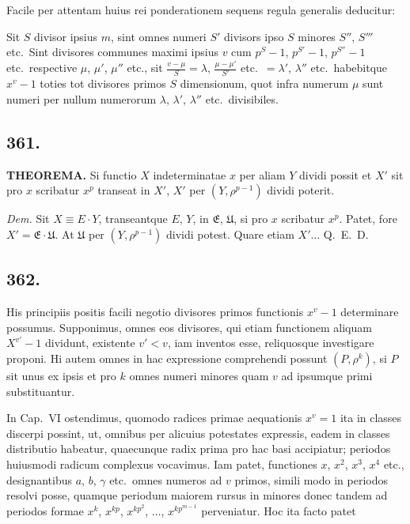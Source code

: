 \documentclass[12pt]{article}
\begin{document}
Facile per attentam huius rei ponderationem sequens regula generalis deducitur:

Sit $S$ divisor ipsius $m$, sint omnes numeri $S'$ divisors ipso $S$ minores $S''$, $S'''$ etc.~Sint divisores communes maximi ipsius $v$ cum $p^S-1$, $p^{S'}-1$, $p^{S''}-1$ etc.~respective $\mu$, $\mu'$, $\mu''$ etc., sit $\frac{v-\mu}{S}=\lambda$, $\frac{\mu-\mu'}{S'}$ etc.~$=\lambda'$, $\lambda''$ etc.~habebitque $x^v-1$ toties tot divisores primos $S$ dimensionum, quot infra numerum $\mu$ sunt numeri per nullum numerorum $\lambda$, $\lambda'$, $\lambda''$ etc.~divisibiles.

\subsection*{361.}

\textbf{THEOREMA.} Si functio $X$ indeterminatae $x$ per aliam $Y$ dividi possit et $X'$ sit pro $x$ scribatur $x^p$ transeat in $X'$, $X'$ per $(Y,\rho^{p-1})$ dividi poterit.

\textit{Dem.} Sit $X\equiv E\cdot Y$, transeantque $E$, $Y$, in $\mathfrak{E}$, $\mathfrak{U}$, si pro $x$ scribatur $x^p$. Patet, fore $X'=\mathfrak{E}\cdot\mathfrak{U}$. At $\mathfrak{U}$ per $(Y,\rho^{p-1})$ dividi potest. Quare etiam $X'\ldots$ Q.~E.~D.

\subsection*{362.}

His principiis positis facili negotio divisores primos functionis $x^v-1$ determinare possumus. Supponimus, omnes eos divisores, qui etiam functionem aliquam $X^{v'}-1$ dividunt, existente $v'<v$, iam inventos esse, reliquosque investigare proponi. Hi autem omnes in hac expressione comprehendi possunt $(P,\rho^k)$, si $P$ sit unus ex ipsis et pro $k$ omnes numeri minores quam $v$ ad ipsumque primi substituantur.

In Cap.~VI ostendimus, quomodo radices primae aequationis $x^v=1$ ita in classes discerpi possint, ut, omnibus per alicuius potestates expressis, eadem in classes distributio habeatur, quaecunque radix prima pro hac basi accipiatur; periodos huiusmodi radicum complexus vocavimus. Iam patet, functiones $x$, $x^2$, $x^3$, $x^4$ etc., designantibus $a$, $b$, $\gamma$ etc.~omnes numeros ad $v$ primos, simili modo in periodos resolvi posse, quamque periodum maiorem rursus in minores donec tandem ad periodos formae $x^k$, $x^{kp}$, $x^{kp^2}$, $\ldots$, $x^{kp^{m-1}}$ perveniatur. Hoc ita facto patet
\end{document}
